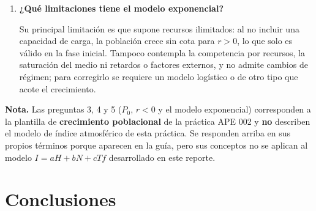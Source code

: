\documentclass[11pt,a4paper]{article}
\begin{document}
\begin{enumerate}[leftmargin=*]
  \item \textbf{¿Qu\'e limitaciones tiene el modelo exponencial?}

  Su principal limitaci\'on es que supone recursos ilimitados: al no incluir una capacidad
  de carga, la poblaci\'on crece sin cota para $r > 0$, lo que solo es v\'alido en la fase
  inicial. Tampoco contempla la competencia por recursos, la saturaci\'on del medio ni
  retardos o factores externos, y no admite cambios de r\'egimen; para corregirlo se
  requiere un modelo log\'istico o de otro tipo que acote el crecimiento.

\end{enumerate}

\textbf{Nota.} Las preguntas 3, 4 y 5 ($P_0$, $r < 0$ y el modelo exponencial)
corresponden a la plantilla de \textbf{crecimiento poblacional} de la pr\'actica APE 002 y
\textbf{no} describen el modelo de \'indice atmosf\'erico de esta pr\'actica. Se responden
arriba en sus propios t\'erminos porque aparecen en la gu\'ia, pero sus conceptos no se
aplican al modelo $I = aH + bN + cTf$ desarrollado en este reporte.

\section{Conclusiones}
\end{document}
